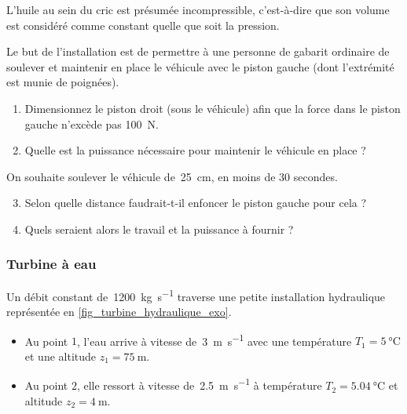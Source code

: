 	L’huile au sein du cric est présumée incompressible, c’est-à-dire que son volume est considéré comme constant quelle que soit la pression.

	Le but de l’installation est de permettre à une personne de gabarit ordinaire de soulever et maintenir en place le véhicule avec le piston gauche (dont l’extrémité est munie de poignées).
	
		\begin{enumerate}
			\item Dimensionnez le piston droit (sous le véhicule) afin que la force dans le piston gauche n’excède pas \SI{100}{\newton}.
			\item Quelle est la puissance nécessaire pour maintenir le véhicule en place ?
		\end{enumerate}
	On souhaite soulever le véhicule de~\SI{25}{\centi\metre}, en moins de 30 secondes.
		\begin{enumerate}
			\setcounter{enumi}{2}
			\item Selon quelle distance faudrait-t-il enfoncer le piston gauche pour cela ?
			\item Quels seraient alors le travail et la puissance à fournir ?
		\end{enumerate}


\subsubsection{Turbine à eau}
\label{exo_turbine_eau_puissances_spe}
	
	Un débit constant de~\SI{1200}{\kilogram\per\second} traverse une petite installation hydraulique représentée en \cref{fig_turbine_hydraulique_exo}.
	\begin{itemize}
		\item Au point $1$, l’eau arrive à vitesse de~\SI{3}{\metre\per\second} avec une température $T_1 = \SI{5}{\degreeCelsius}$ et une altitude $z_1 = \SI{75}{\metre}$.
		\item Au point $2$, elle ressort à vitesse de~\SI{2,5}{\metre\per\second} à température $T_2 = \SI{5,04}{\degreeCelsius}$ et altitude $z_2 = \SI{4}{\metre}$.
	\end{itemize}

